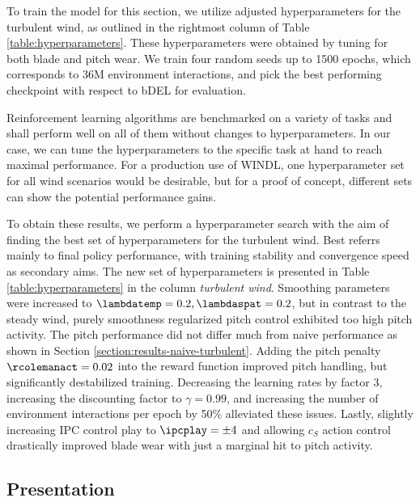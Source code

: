 To train the model for this section, we utilize adjusted hyperparameters for the turbulent wind, as outlined in the rightmost column of Table \ref{table:hyperparameters}. These hyperparameters were obtained by tuning for both blade and pitch wear. We train four random seeds up to 1500 epochs, which corresponds to 36M environment interactions, and pick the best performing checkpoint with respect to bDEL for evaluation.

Reinforcement learning algorithms are benchmarked on a variety of tasks and shall perform well on all of them without changes to hyperparameters. In our case, we can tune the hyperparameters to the specific task at hand to reach maximal performance. For a production use of WINDL, one hyperparameter set for all wind scenarios would be desirable, but for a proof of concept, different sets can show the potential performance gains. 

To obtain these results, we perform a hyperparameter search with the aim of finding the best set of hyperparameters for the turbulent wind. Best referrs mainly to final policy performance, with training stability and convergence speed as secondary aims. The new set of hyperparameters is presented in Table \ref{table:hyperparameters} in the column \textit{turbulent wind}. Smoothing parameters were increased to $\lambdatemp=0.2, \lambdaspat=0.2$, but in contrast to the steady wind, purely smoothness regularized pitch control exhibited too high pitch activity. The pitch performance did not differ much from naive performance as shown in Section \ref{section:results-naive-turbulent}. Adding the pitch penalty $\rcolemanact=0.02$ into the reward function improved pitch handling, but significantly destabilized training. Decreasing the learning rates by factor 3, increasing the discounting factor to $\gamma=0.99$, and increasing the number of environment interactions per epoch by 50\% alleviated these issues. Lastly, slightly increasing IPC control play to $\ipcplay=\pm4$ and allowing $c_S$ action control drastically improved blade wear with just a marginal hit to pitch activity.

\subsection{Presentation}

